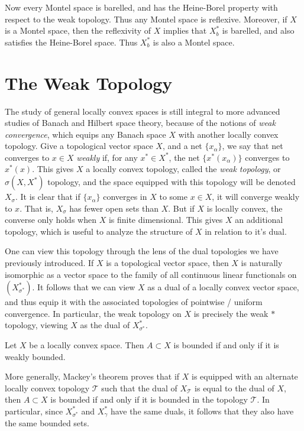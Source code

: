 Now every Montel space is barelled, and has the Heine-Borel property with respect to the weak topology. Thus any Montel space is reflexive. Moreover, if $X$ is a Montel space, then the reflexivity of $X$ implies that $X^*_b$ is barelled, and also satisfies the Heine-Borel space. Thus $X^*_b$ is also a Montel space.



\section{The Weak Topology}

The study of general locally convex spaces is still integral to more advanced studies of Banach and Hilbert space theory, because of the notions of \emph{weak convergence}, which equips any Banach space $X$ with another locally convex topology. Give a topological vector space $X$, and a net $\{ x_\alpha \}$, we say that net converges to $x \in X$ \emph{weakly} if, for any $x^* \in X^*$, the net $\{ x^*(x_\alpha) \}$ converges to $x^*(x)$. This gives $X$ a locally convex topology, called the \emph{weak topology}, or $\sigma(X,X^*)$ topology, and the space equipped with this topology will be denoted $X_\sigma$. It is clear that if $\{ x_\alpha \}$ converges in $X$ to some $x \in X$, it will converge weakly to $x$. That is, $X_\sigma$ has fewer open sets than $X$. But if $X$ is locally convex, the converse only holds when $X$ is finite dimensional. This gives $X$ an additional topology, which is useful to analyze the structure of $X$ in relation to it's dual.

One can view this topology through the lens of the dual topologies we have previously introduced. If $X$ is a topological vector space, then $X$ is naturally isomorphic as a vector space to the family of all continuous linear functionals on $(X^*_{\sigma^*})$. It follows that we can view $X$ as a dual of a locally convex vector space, and thus equip it with the associated topologies of pointwise / uniform convergence. In particular, the weak topology on $X$ is precisely the weak $*$ topology, viewing $X$ as the dual of $X^*_{\sigma^*}$.

\begin{theorem}
    Let $X$ be a locally convex space. Then $A \subset X$ is bounded if and only if it is weakly bounded.
\end{theorem}

More generally, Mackey's theorem proves that if $X$ is equipped with an alternate locally convex topology $\mathcal{T}$ such that the dual of $X_{\mathcal{T}}$ is equal to the dual of $X$, then $A \subset X$ is bounded if and only if it is bounded in the topology $\mathcal{T}$. In particular, since $X^*_{\sigma^*}$ and $X^*_\gamma$ have the same duals, it follows that they also have the same bounded sets.

